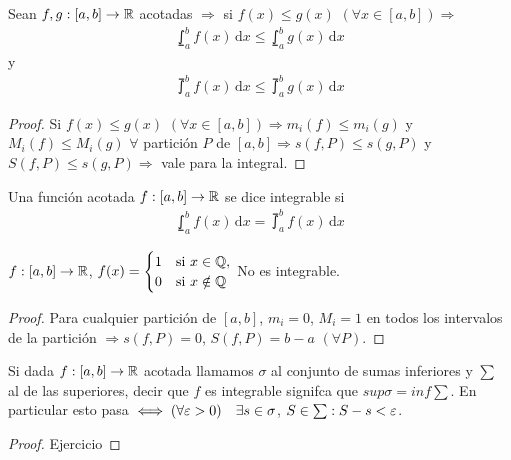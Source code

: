 \begin{prop}
  Sean \(f, g: [a, b] \to \mathbb{R}\) acotadas \(\Rightarrow\) si \(f(x) \leq g(x)\) \((\forall x \in [a, b]) \Rightarrow\) \begin{align*}
    \lowint_a^b f(x)\,\mathrm{d}x \leq \lowint_a^b g(x)\,\mathrm{d}x
  \end{align*} y \begin{align*}
    \upint_a^b f(x)\, \mathrm{d}x \leq \upint_a^b g(x)\, \mathrm{d}x
  \end{align*}
  \begin{proof}
    Si \(f(x) \leq g(x)\) \((\forall x \in [a, b]) \Rightarrow m_i(f) \leq m_i(g)\) y \(M_i(f) \leq M_i(g)\) \(\forall\) partición \(P\) de \([a, b] \Rightarrow s(f, P) \leq s(g, P)\) y \(S(f, P) \leq s(g, P) \Rightarrow\) vale para la integral.
  \end{proof}
\end{prop}

\begin{definition}[Integrable]
  Una función acotada \(f: [a, b] \to \mathbb{R}\) se dice integrable si \begin{align*}
    \lowint_a^b f(x) \, \mathrm{d}x = \upint_a^b f(x) \, \mathrm{d}x
  \end{align*}
\end{definition}

\clearpage

\begin{eg}
  \(f: [a, b] \to \mathbb{R}\), \(f(x) = \begin{cases}
      1 & \text{si } x \in \mathbb{Q},   \\
      0 & \text{si } x \notin \mathbb{Q}
    \end{cases}\)
  No es integrable.
  \begin{proof}
    Para cualquier partición de \([a, b]\), \(m_i = 0\), \(M_i = 1\) en todos los intervalos de la partición \(\Rightarrow s(f, P) = 0\), \(S(f, P) = b-a\) \((\forall P)\).
  \end{proof}
\end{eg}

\begin{note}
  Si dada \(f: [a, b] \to \mathbb{R}\) acotada llamamos \(\sigma\) al conjunto de sumas inferiores y \(\sum\) al de las superiores, decir que \(f\) es integrable signifca que \(sup \sigma = inf \sum\).
  En particular esto pasa \(\iff (\forall \varepsilon > 0) \quad \exists s \in \sigma\), \(S \in \sum : S - s < \varepsilon\).
  \begin{proof}
    Ejercicio
  \end{proof}
\end{note}

